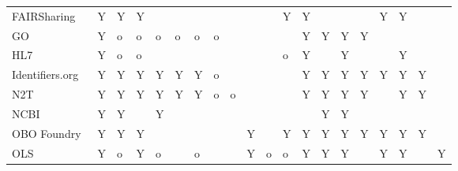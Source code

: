 \begin{table}
\begin{tabular}{llllllllllllllllllll}
         FAIRSharing~\cite{Sansone2019} &              Y &        Y &     Y &            &            &          &                &               &         &         &       Y &                          Y &           &                   &                    &             Y &               Y &                &               \\
GO~\cite{TheGeneOntologyConsortium2019} &              Y &        o &     o &          o &          o &        o &              o &               &         &         &         &                          Y &         Y &                 Y &                  Y &               &                 &                &               \\
                                    HL7 &              Y &        o &     o &            &            &          &                &               &         &         &       o &                          Y &           &                 Y &                    &               &               Y &                &               \\
        Identifiers.org~\cite{Juty2012} &              Y &        Y &     Y &          Y &          Y &        Y &              o &               &         &         &         &                          Y &         Y &                 Y &                  Y &             Y &               Y &              Y &               \\
             N2T~\cite{Wimalaratne2018} &              Y &        Y &     Y &          Y &          Y &        Y &              o &             o &         &         &         &                          Y &         Y &                 Y &                  Y &               &               Y &              Y &               \\
                  NCBI~\cite{Clark2016} &              Y &        Y &       &          Y &            &          &                &               &         &         &         &                            &         Y &                 Y &                    &               &                 &                &               \\
         OBO Foundry~\cite{Jackson2021} &              Y &        Y &     Y &            &            &          &                &               &       Y &         &       Y &                          Y &         Y &                 Y &                  Y &             Y &               Y &              Y &               \\
                   OLS~\cite{Cote2006a} &              Y &        o &     Y &          o &            &        o &                &               &       Y &       o &       o &                          Y &         Y &                 Y &                    &             Y &               Y &                &             Y \\

\end{tabular}
\end{table}
